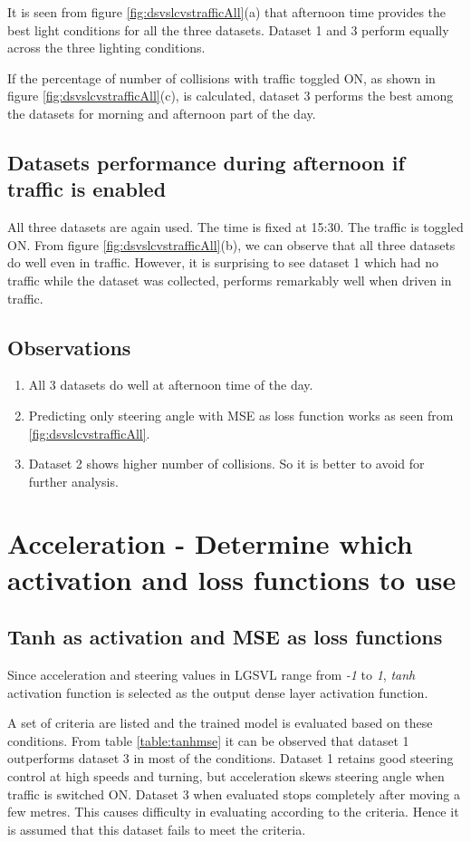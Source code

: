 It is seen from figure \ref{fig:dsvslcvstrafficAll}(a) that afternoon time provides the best light conditions for all the three
datasets. Dataset 1 and 3 perform equally across the three lighting conditions.

If the percentage of number of collisions with traffic toggled ON, as shown in figure
\ref{fig:dsvslcvstrafficAll}(c), is calculated, dataset 3 performs the best among
the datasets for morning and afternoon part of the day.

\subsection{Datasets performance during afternoon if traffic is enabled}
All three datasets are again used. The time is fixed at 15:30. The traffic is toggled ON.
From figure \ref{fig:dsvslcvstrafficAll}(b), we can observe that all three datasets do
well even in traffic. However, it is surprising to see dataset 1 which had no traffic
while the dataset was collected, performs remarkably well when driven in traffic.
\subsection{Observations}
\begin{enumerate}
    \item All 3 datasets do well at afternoon time of the day.
    \item Predicting only steering angle with MSE as loss function works as seen from
        \ref{fig:dsvslcvstrafficAll}.
    \item Dataset 2 shows higher number of collisions. So it is better to avoid for
        further analysis.
\end{enumerate}

\section{Acceleration - Determine which activation and loss functions to use}

\subsection{Tanh as activation and MSE as loss functions}
Since acceleration and steering values in LGSVL range from \textit{-1} to \textit{1},
\textit{tanh} activation function is selected as the output dense layer activation
function.

A set of criteria are listed and the trained model is evaluated based on these conditions.
From table \ref{table:tanhmse} it can be observed that dataset 1 outperforms dataset 3 in
most of the conditions. Dataset 1 retains good steering control at high speeds and
turning, but acceleration skews steering angle when traffic is switched ON. Dataset 3 when
evaluated stops completely after moving a few metres. This causes difficulty in evaluating
according to the criteria. Hence it is assumed that this dataset fails to meet the
criteria.


